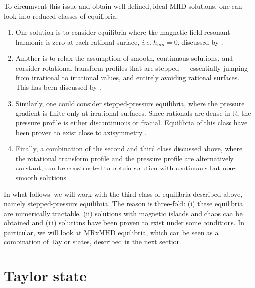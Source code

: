 \documentclass[my_thesis.tex]{subfiles}
\begin{document}
To circumvent this issue and obtain well defined, ideal MHD solutions, one can look into reduced classes of equilibria.
\begin{enumerate}
	\item One solution is to consider equilibria where the magnetic field resonant harmonic is zero at each rational surface, \emph{i.e.} $h_{mn}=0$, discussed by \citet{Weitzner2014}.
	\item Another is to relax the assumption of smooth, continuous solutions, and consider rotational transform profiles that are stepped --- essentially jumping from irrational to irrational values, and entirely avoiding rational surfaces. This has been discussed by \citet{Loizu2015a}.
	\item Similarly, one could consider stepped-pressure equilibria, where the pressure gradient is finite only at irrational surfaces. Since rationals are dense in $\mathbb{R}$, the pressure profile is either discontinuous or fractal. Equilibria of this class have been proven to exist close to axisymmetry \citep{Bruno1996}.
	\item Finally, a combination of the second and third class discussed above, where the rotational transform profile and the pressure profile are alternatively constant, can be constructed to obtain solution with continuous but non-smooth solutions \citep{Hudson2017a}
\end{enumerate}
In what follows, we will work with the third class of equilibria described above, namely stepped-pressure equilibria. The reason is three-fold: (i) these equilibria are numerically tractable, (ii) solutions with magnetic islands and chaos can be obtained and (iii) solutions have been proven to exist under some conditions. In particular, we will look at \ac{MRxMHD} equilibria, which can be seen as a combination of Taylor states, described in the next section.

\section{Taylor state}
\label{section taylor state}
\end{document}

